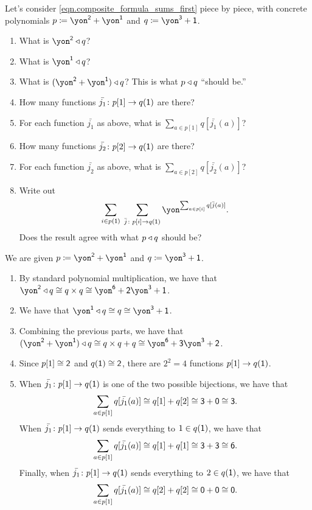 \documentclass[Book-Poly]{subfiles}
\begin{document}
\begin{exercise}
Let's consider \eqref{eqn.composite_formula_sums_first} piece by piece, with concrete polynomials $p\coloneqq\yon^\2+\yon^\1$ and $q\coloneqq \yon^\3+\1$.
\begin{enumerate}
	\item What is $\yon^\2\tri q$? 
	\item What is $\yon^\1\tri q$?
	\item What is $(\yon^\2+\yon^\1)\tri q$? This is what $p\mathbin{\triangleleft} q$ ``should be.''
	\item How many functions $\bar{j_1}\colon p[1]\to q(\textsf{1})$ are there?
	\item For each function $\bar{j_1}$ as above, what is $\sum_{a\in p[1]} q[\bar{j_1}(a)]$?
	\item How many functions $\bar{j_2}\colon p[2]\to q(\textsf{1})$ are there?
	\item For each function $\bar{j_2}$ as above, what is $\sum_{a\in p[2]} q[\bar{j_2}(a)]$?
	\item Write out \[\sum_{i\in p(\1)}\;\sum_{\bar{j}\colon p[i]\to q(\1)}\yon^{\sum_{a\in p[i]}q[\bar{j}(a)]}.\]
	Does the result agree with what $p\mathbin{\triangleleft} q$ should be?
\qedhere
\end{enumerate}
\begin{solution}
We are given $p\coloneqq\yon^\2+\yon^\1$ and $q\coloneqq \yon^\3+\1$.
\begin{enumerate}
    \item By standard polynomial multiplication, we have that $\yon^\2 \tri q \iso q \times q \iso \yon^\6 + \2\yon^\3 + \1$.
    \item We have that $\yon^\1 \tri q \iso q \iso \yon^\3 + \1$.
    \item Combining the previous parts, we have that $(\yon^\2 + \yon^\1) \tri q \iso q \times q + q \iso \yon^\6 + \3\yon^\3 + \2$.
    \item Since $p[1] \cong \textsf{2}$ and $q(\textsf{1}) \cong \textsf{2}$, there are $2^2 = 4$ functions $p[1] \to q(\textsf{1})$.
    \item When $\bar{j_1} \colon p[1] \to q(\textsf{1})$ is one of the two possible bijections, we have that
    \[
        \sum_{a \in p[1]} q[\bar{j_1}(a)] \cong q[1] + q[2] \cong \textsf{3} + \textsf{0} \cong \textsf{3}.
    \]
    When $\bar{j_1} \colon p[1] \to q(\textsf{1})$ sends everything to $1 \in q(\textsf{1})$, we have that
    \[
        \sum_{a \in p[1]} q[\bar{j_1}(a)] \cong q[1] + q[1] \cong \textsf{3} + \textsf{3} \cong \textsf{6}.
    \]
    Finally, when $\bar{j_1} \colon p[1] \to q(\textsf{1})$ sends everything to $2 \in q(\textsf{1})$, we have that
    \[
        \sum_{a \in p[1]} q[\bar{j_1}(a)] \cong q[2] + q[2] \cong \textsf{0} + \textsf{0} \cong \textsf{0}.
\]
\end{enumerate}
\end{solution}
\end{exercise}
\end{document}
